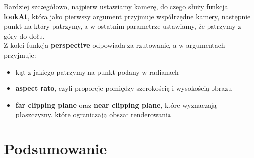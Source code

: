 \documentclass[14pt,twoside,a4paper]{article}
\theoremstyle{definition}
\begin{document}
Bardziej szczegółowo, najpierw ustawiamy kamerę, do czego służy funkcja \textbf{lookAt}\cite{opengl}, która jako pierwszy argument przyjmuje współrzędne kamery, następnie punkt na który patrzymy, a w ostatnim parametrze ustawiamy, że patrzymy z góry do dołu.\\
Z kolei funkcja \textbf{perspective}\cite{opengl} odpowiada za rzutowanie, a w argumentach przyjmuje:
\begin{itemize}
\item kąt z jakiego patrzymy na punkt podany w radianach
\item \textbf{aspect rato}, czyli proporcje pomiędzy szerokością i wysokością obrazu
\item \textbf{far clipping plane} oraz \textbf{near clipping plane}, które wyznaczają płaszczyzny, które ograniczają obszar renderowania
\end{itemize} 

\newpage

\section{\LARGE Podsumowanie}

\newpage

\nocite{*}
\printbibliography%
\end{document}
